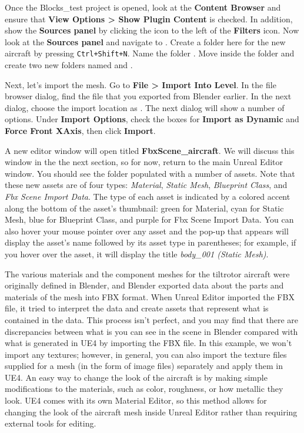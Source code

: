 Once the Blocks\_test project is opened, look at the \textbf{Content Browser} and ensure that \textbf{View Options > Show Plugin Content} is checked. In addition, show the \textbf{Sources panel} by clicking the icon to the left of the \textbf{Filters} icon. Now look at the \textbf{Sources panel} and navigate to . Create a folder here for the new aircraft by pressing \texttt{Ctrl+Shift+N}. Name the folder . Move inside the  folder and create two new folders named  and .

Next, let's import the mesh. Go to \textbf{File > Import Into Level}. In the file browser dialog, find the  file that you exported from Blender earlier. In the next dialog, choose the import location as . The next dialog will show a number of options. Under \textbf{Import Options}, check the boxes for \textbf{Import as Dynamic} and \textbf{Force Front XAxis}, then click \textbf{Import}.

A new editor window will open titled \textbf{FbxScene\_aircraft}. We will discuss this window in the the next section, so for now, return to the main Unreal Editor window. You should see the  folder populated with a number of assets. Note that these new assets are of four types: \textit{Material}, \textit{Static Mesh}, \textit{Blueprint Class}, and \textit{Fbx Scene Import Data}. The type of each asset is indicated by a colored accent along the bottom of the asset's thumbnail: green for Material, cyan for Static Mesh, blue for Blueprint Class, and purple for Fbx Scene Import Data. You can also hover your mouse pointer over any asset and the pop-up that appears will display the asset's name followed by its asset type in parentheses; for example, if you hover over the  asset, it will display the title \textit{body\_001 (Static Mesh)}.

The various materials and the component meshes for the tiltrotor aircraft were originally defined in Blender, and Blender exported data about the parts and materials of the mesh into FBX format.  When Unreal Editor imported the FBX file, it tried to interpret the data and create assets that represent what is contained in the data. This process isn't perfect, and you may find that there are discrepancies between what is you can see in the scene in Blender compared with what is generated in UE4 by importing the FBX file. In this example, we won't import any textures; however, in general, you can also import the texture files supplied for a mesh (in the form of image files) separately and apply them in UE4. An easy way to change the look of the aircraft is by making simple modifications to the materials, such as color, roughness, or how metallic they look. UE4 comes with its own Material Editor, so this method allows for changing the look of the aircraft mesh inside Unreal Editor rather than requiring external tools for editing.

